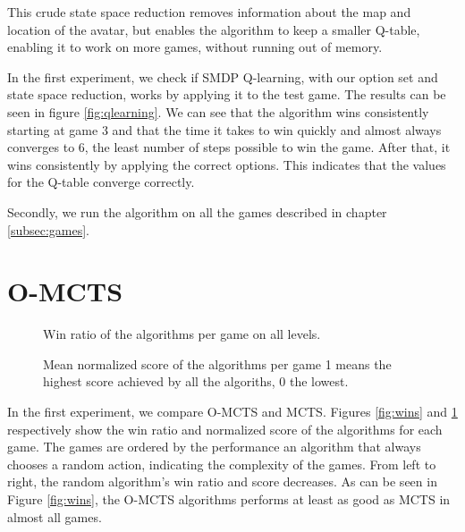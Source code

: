 This crude state space reduction removes information about the map and location
of the avatar, but enables the algorithm to keep a smaller Q-table, enabling it
to work on more games, without running out of memory.

In the first experiment, we check if SMDP Q-learning, with our option set and
state space reduction, works by applying it to the test game. The results can be
seen in figure \ref{fig:qlearning}. We can see that the algorithm wins
consistently starting at game 3 and that the time it takes to win quickly and
almost always converges to 6, the least number of steps possible to win the
game. After that, it wins consistently by applying the correct options. This
indicates that the values for the Q-table converge correctly.

Secondly, we run the algorithm on all the games described in chapter  
\ref{subsec:games}. 

\section{O-MCTS}
\label{subsec:omcts}
\begin{figure}
	\centering
	\vspace{-.8cm}
	\caption{Win ratio of the algorithms per game on all levels.}
	\label{fig:wins}
	\centering
	\vspace{-.8cm}
	\caption{Mean normalized score of the algorithms per game 1 means the
	highest score achieved by all the algoriths, 0 the lowest.}
	\label{fig:scores}
\end{figure}

In the first experiment, we compare O-MCTS and MCTS. Figures \ref{fig:wins} and
\ref{fig:scores} respectively show the win ratio and normalized score of the
algorithms for each game. The games are ordered by the performance an algorithm
that always chooses a random action, indicating the complexity of the games.
From left to right, the random algorithm's win ratio and score decreases. As can
be seen in Figure \ref{fig:wins}, the O-MCTS algorithms performs at least as
good as MCTS in almost all games. 

